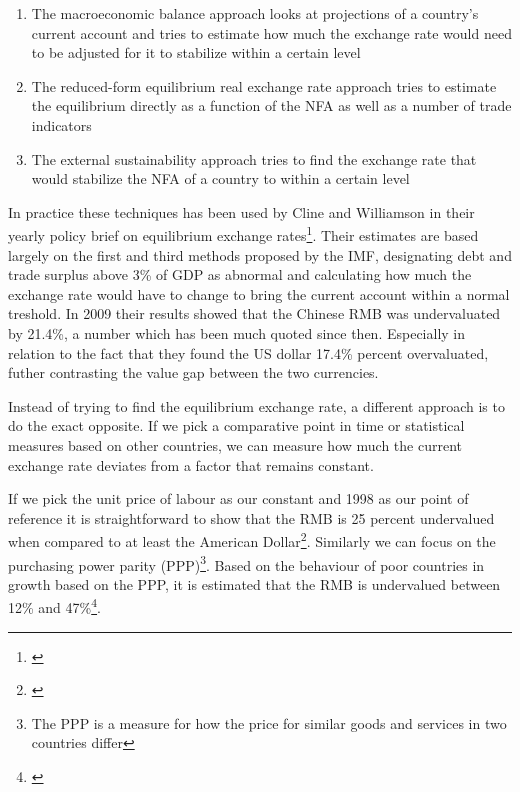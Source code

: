 \documentclass[11pt]{article}
\begin{document}
\begin{enumerate}
\item{The macroeconomic balance approach looks at projections of a 
	country's current account and tries to estimate how much the 
exchange rate would need to be adjusted for it to stabilize within a 
certain level}
\item{The reduced-form equilibrium real exchange rate approach tries to 
	estimate the equilibrium directly as a function of the NFA as well 
as a number of trade indicators}
\item{The external sustainability approach tries to find the exchange 
	rate that would stabilize the NFA of a country to within a certain 
level}
\end{enumerate}

In practice these techniques has been used by Cline and Williamson in 
their yearly policy brief on equilibrium exchange 
rates\footnote{\cite{cline2009,cline2012}}.  Their estimates are based 
largely on the first and third methods proposed by the IMF, designating 
debt and trade surplus above 3\% of GDP as abnormal and calculating how 
much the exchange rate would have to change to bring the current account 
within a normal treshold. In 2009 their results showed that the Chinese 
RMB was undervaluated by 21.4\%, a number which has been much quoted 
since then. Especially in relation to the fact that they found the US 
dollar 17.4\% percent overvaluated, futher contrasting the value gap 
between the two currencies.

% 
Instead of trying to find the equilibrium exchange rate, a different 
approach is to do the exact opposite. If we pick a comparative point in 
time or statistical measures based on other countries, we can measure 
how much the current exchange rate deviates from a factor that remains 
constant.

If we pick the unit price of labour as our constant and 1998 as our 
point of reference it is straightforward to show that the RMB is 25 
percent undervalued when compared to at least the American 
Dollar\footnote{\cite{chimerica2009}}. Similarly we can focus on the 
purchasing power parity (PPP)\footnote{The PPP is a measure for how the 
price for similar goods and services in two countries differ}. Based on 
the behaviour of poor countries in growth based on the PPP, it is 
estimated that the RMB is undervalued between 12\% and 
47\%\footnote{\cite{Subramanian2010}}.

\end{document}
